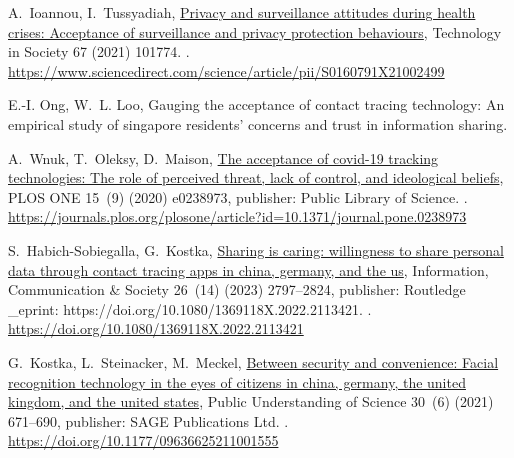 \documentclass[
  number]{elsarticle}
\begin{document}
\begin{thebibliography}{10}
A.~Ioannou, I.~Tussyadiah, \href{https://www.sciencedirect.com/science/article/pii/S0160791X21002499}{Privacy and surveillance attitudes during health crises: Acceptance of surveillance and privacy protection behaviours}, Technology in Society 67 (2021) 101774.
\newblock \href {https://doi.org/10.1016/j.techsoc.2021.101774} {}.
\newline\urlprefix\url{https://www.sciencedirect.com/science/article/pii/S0160791X21002499}

E.-I. Ong, W.~L. Loo, Gauging the acceptance of contact tracing technology: An empirical study of singapore residents' concerns and trust in information sharing\href {https://doi.org/10.2139/ssrn.3817972} {}.

A.~Wnuk, T.~Oleksy, D.~Maison, \href{https://journals.plos.org/plosone/article?id=10.1371/journal.pone.0238973}{The acceptance of covid-19 tracking technologies: The role of perceived threat, lack of control, and ideological beliefs}, PLOS ONE 15~(9) (2020) e0238973, publisher: Public Library of Science.
\newblock \href {https://doi.org/10.1371/journal.pone.0238973} {}.
\newline\urlprefix\url{https://journals.plos.org/plosone/article?id=10.1371/journal.pone.0238973}

S.~Habich-Sobiegalla, G.~Kostka, \href{https://doi.org/10.1080/1369118X.2022.2113421}{Sharing is caring: willingness to share personal data through contact tracing apps in china, germany, and the us}, Information, Communication \& Society 26~(14) (2023) 2797--2824, publisher: Routledge {\_}eprint: https://doi.org/10.1080/1369118X.2022.2113421.
\newblock \href {https://doi.org/10.1080/1369118X.2022.2113421} {}.
\newline\urlprefix\url{https://doi.org/10.1080/1369118X.2022.2113421}

G.~Kostka, L.~Steinacker, M.~Meckel, \href{https://doi.org/10.1177/09636625211001555}{Between security and convenience: Facial recognition technology in the eyes of citizens in china, germany, the united kingdom, and the united states}, Public Understanding of Science 30~(6) (2021) 671--690, publisher: SAGE Publications Ltd.
\newblock \href {https://doi.org/10.1177/09636625211001555} {}.
\newline\urlprefix\url{https://doi.org/10.1177/09636625211001555}


\end{thebibliography}
\end{document}
